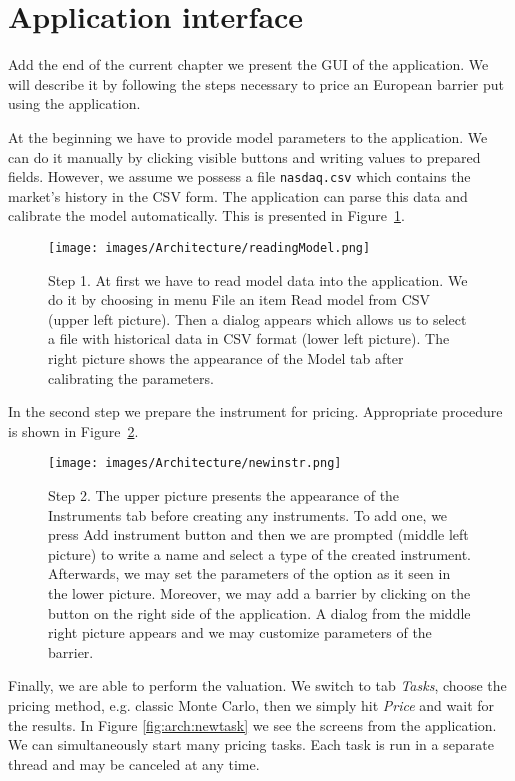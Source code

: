 \documentclass[a4paper,11pt, twoside]{book}
\theoremstyle{definition}
\theoremstyle{remark}
\begin{document}
\newpage
\section{Application interface}
Add the end of the current chapter we present the GUI of the application. We will describe it by following the steps necessary to price an European barrier put using the application.

At the beginning we have to provide model parameters to the application. We can do it manually by clicking visible buttons and writing values to prepared fields. However, we assume we possess a file \texttt{nasdaq.csv} which contains the market's history in the CSV form. The application can parse this data and calibrate the model automatically. This is presented in Figure~\ref{fig:arch:reading}.
\begin{figure}[!ht]
\centering
 \texttt{[image: images/Architecture/readingModel.png]}
 \caption{Step 1. At first we have to read model data into the application. We do it by choosing in menu {\upshape File} an item {\upshape Read model from CSV} (upper left picture). Then a dialog appears which allows us to select a file with historical data in CSV format (lower left picture). The right picture shows the appearance of the {\upshape Model} tab after calibrating the parameters.}
\label{fig:arch:reading}
\end{figure}

\FloatBarrier
In the second step we prepare the instrument for pricing. Appropriate procedure is shown in Figure~\ref{fig:arch:newinstr}.
\begin{figure}[!hb]
\centering
 \texttt{[image: images/Architecture/newinstr.png]}
 \caption{Step 2. The upper picture presents the appearance of the {\upshape Instruments} tab before creating any instruments. To add one, we press {\upshape Add instrument} button and then we are prompted (middle left picture) to write a name and select a type of the created instrument. Afterwards, we may set the parameters of the option as it seen in the lower picture. Moreover, we may add a barrier by clicking on the button on the right side of the application. A dialog from the middle right picture appears and we may customize parameters of the barrier.}
\label{fig:arch:newinstr}
\end{figure}
Finally, we are able to perform the valuation. We switch to tab \textit{Tasks}, choose the pricing method, e.g. classic Monte Carlo, then we simply hit \textit{Price} and wait for the results. In Figure \ref{fig:arch:newtask} we see the screens from the application. We can simultaneously start many pricing tasks. Each task is run in a separate thread and may be canceled at any time.
\end{document}
